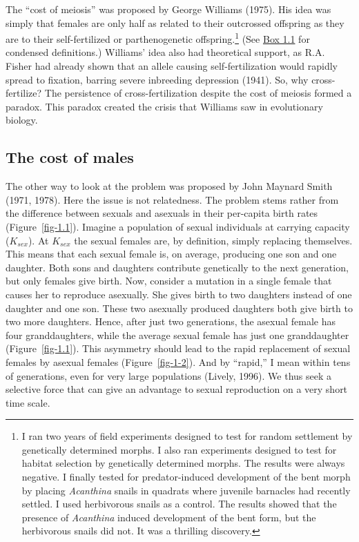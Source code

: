 \documentclass[
  letterpaper,
]{book}
\begin{document}
The ``cost of meiosis'' was proposed by George Williams (1975). His idea
was simply that females are only half as related to their outcrossed
offspring as they are to their self-fertilized or parthenogenetic
offspring.\footnote{I ran two years of field experiments designed to
  test for random settlement by genetically determined morphs. I also
  ran experiments designed to test for habitat selection by genetically
  determined morphs. The results were always negative. I finally tested
  for predator-induced development of the bent morph by placing
  \emph{Acanthina} snails in quadrats where juvenile barnacles had
  recently settled. I used herbivorous snails as a control. The results
  showed that the presence of \emph{Acanthina} induced development of
  the bent form, but the herbivorous snails did not. It was a thrilling
  discovery.} (See \protect\hyperlink{callout-1}{Box 1.1} for condensed
definitions.) Williams' idea also had theoretical support, as R.A.
Fisher had already shown that an allele causing self-fertilization would
rapidly spread to fixation, barring severe inbreeding depression (1941).
So, why cross-fertilize? The persistence of cross-fertilization despite
the cost of meiosis formed a paradox. This paradox created the crisis
that Williams saw in evolutionary biology.

\hypertarget{the-cost-of-males}{%
\subsection{The cost of males}\label{the-cost-of-males}}

The other way to look at the problem was proposed by John Maynard Smith
(1971, 1978). Here the issue is not relatedness. The problem stems
rather from the difference between sexuals and asexuals in their
per-capita birth rates (Figure~\ref{fig-1.1}). Imagine a population of
sexual individuals at carrying capacity (\(K_{sex}\)). At \(K_{sex}\)
the sexual females are, by definition, simply replacing themselves. This
means that each sexual female is, on average, producing one son and one
daughter. Both sons and daughters contribute genetically to the next
generation, but only females give birth. Now, consider a mutation in a
single female that causes her to reproduce asexually. She gives birth to
two daughters instead of one daughter and one son. These two asexually
produced daughters both give birth to two more daughters. Hence, after
just two generations, the asexual female has four granddaughters, while
the average sexual female has just one granddaughter
(Figure~\ref{fig-1.1}). This asymmetry should lead to the rapid
replacement of sexual females by asexual females (Figure~\ref{fig-1-2}).
And by ``rapid,'' I mean within tens of generations, even for very large
populations (Lively, 1996). We thus seek a selective force that can give
an advantage to sexual reproduction on a very short time scale.
\end{document}
